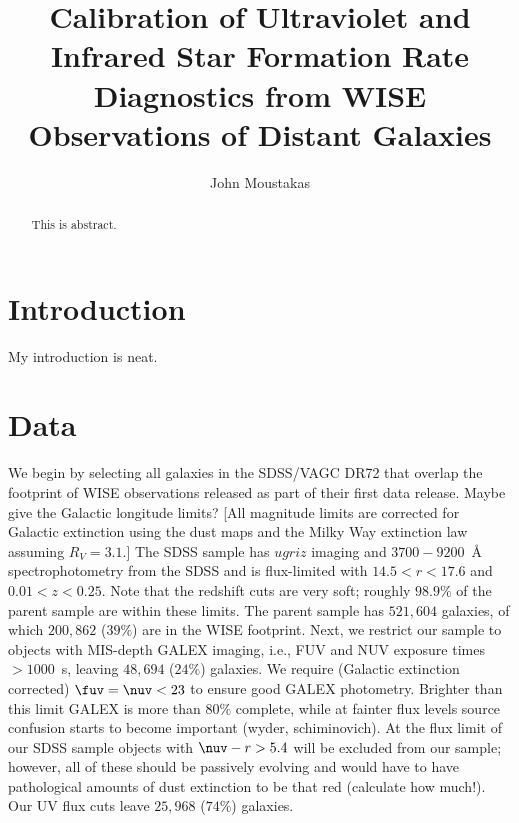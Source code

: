 \documentclass{emulateapj}
\begin{document}
\title{Calibration of Ultraviolet and Infrared Star Formation Rate
  Diagnostics from WISE Observations of Distant Galaxies}

\author{John Moustakas \etal}


\begin{abstract} 
This is abstract.
\end{abstract}


\section{Introduction}\label{sec:intro}
My introduction is neat.

\section{Data}\label{sec:data}

We begin by selecting all galaxies in the SDSS/VAGC DR72 that overlap
the footprint of WISE observations released as part of their first
data release.  Maybe give the Galactic longitude limits?  [All
  magnitude limits are corrected for Galactic extinction using the
  \citet{schlegel98a} dust maps and the \citet{cardelli89a} Milky Way
  extinction law assuming $R_{V}=3.1$.]  The SDSS sample has $ugriz$
imaging and $3700-9200$~\AA{} spectrophotometry from the SDSS and is
flux-limited with $14.5<r<17.6$ and $0.01<z<0.25$.  Note that the
redshift cuts are very soft; roughly $98.9\%$ of the parent sample are
within these limits.  The parent sample has $521,604$ galaxies, of
which $200,862$ ($39\%$) are in the WISE footprint.  Next, we restrict
our sample to objects with MIS-depth GALEX imaging, i.e., FUV and NUV
exposure times $>1000$~s, leaving $48,694$ ($24\%$) galaxies.  We
require (Galactic extinction corrected) $\fuv=\nuv<23$ to ensure good
GALEX photometry.  Brighter than this limit GALEX is more than $80\%$
complete, while at fainter flux levels source confusion starts to
become important (wyder, schiminovich).  At the flux limit of our SDSS
sample objects with $\nuv-r>5.4$ will be excluded from our sample;
however, all of these should be passively evolving and would have to
have pathological amounts of dust extinction to be that red (calculate
how much!).  Our UV flux cuts leave $25,968$ ($74\%$) galaxies.
\end{document}
